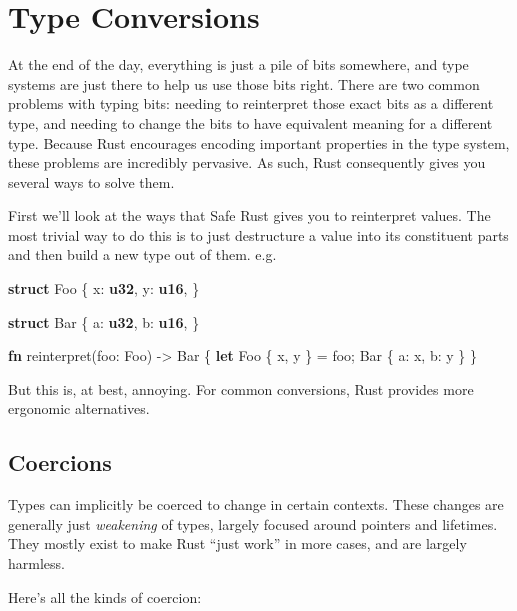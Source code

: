 \documentclass[a4paper,]{book}
\newenvironment{Shaded}{\begin{snugshade}}{\end{snugshade}}
\newcommand{\KeywordTok}[1]{\textcolor[rgb]{0.13,0.29,0.53}{\textbf{{#1}}}}
\newcommand{\NormalTok}[1]{{#1}}
\begin{document}
\chapter{Type Conversions}\label{sec--conversions}

At the end of the day, everything is just a pile of bits somewhere, and
type systems are just there to help us use those bits right. There are
two common problems with typing bits: needing to reinterpret those exact
bits as a different type, and needing to change the bits to have
equivalent meaning for a different type. Because Rust encourages
encoding important properties in the type system, these problems are
incredibly pervasive. As such, Rust consequently gives you several ways
to solve them.

First we'll look at the ways that Safe Rust gives you to reinterpret
values. The most trivial way to do this is to just destructure a value
into its constituent parts and then build a new type out of them. e.g.

\begin{Shaded}
\begin{Highlighting}[]
\KeywordTok{struct} \NormalTok{Foo \{}
    \NormalTok{x: }\KeywordTok{u32}\NormalTok{,}
    \NormalTok{y: }\KeywordTok{u16}\NormalTok{,}
\NormalTok{\}}

\KeywordTok{struct} \NormalTok{Bar \{}
    \NormalTok{a: }\KeywordTok{u32}\NormalTok{,}
    \NormalTok{b: }\KeywordTok{u16}\NormalTok{,}
\NormalTok{\}}

\KeywordTok{fn} \NormalTok{reinterpret(foo: Foo) -> Bar \{}
    \KeywordTok{let} \NormalTok{Foo \{ x, y \} = foo;}
    \NormalTok{Bar \{ a: x, b: y \}}
\NormalTok{\}}
\end{Highlighting}
\end{Shaded}

But this is, at best, annoying. For common conversions, Rust provides
more ergonomic alternatives.

\section{Coercions}\label{sec--coercions}

Types can implicitly be coerced to change in certain contexts. These
changes are generally just \emph{weakening} of types, largely focused
around pointers and lifetimes. They mostly exist to make Rust ``just
work'' in more cases, and are largely harmless.

Here's all the kinds of coercion:
\end{document}
